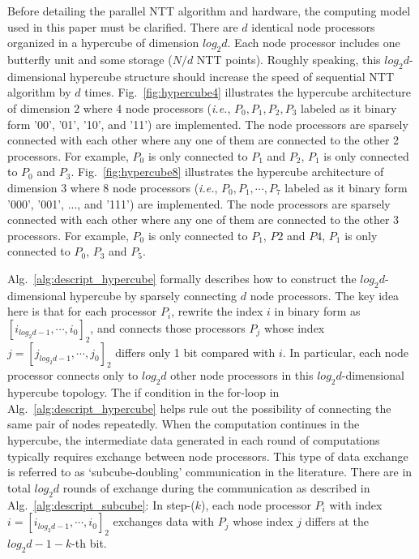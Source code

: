 \documentclass{iacrtrans}
\theoremstyle{plain}
\begin{document}
Before detailing the parallel NTT algorithm and hardware, the computing model used in this paper must be clarified. There are $d$ identical node processors organized in a hypercube of dimension $log_2d$. Each node processor includes one butterfly unit and some storage ($N/d$ NTT points). Roughly speaking, this $log_2d$-dimensional hypercube structure should increase the speed of sequential NTT algorithm by $d$ times. Fig.~\ref{fig:hypercube4} illustrates the hypercube architecture of dimension $2$ where $4$ node processors (\textit{i.e.}, $P_0,P_1,P_2,P_3$ labeled as it binary form '00', '01', '10', and '11') are implemented. The node processors are sparsely connected with each other where any one of them are connected to the other 2 processors. For example, $P_0$ is only connected to $P_1$ and $P_2$,  $P_1$ is only connected to $P_0$ and $P_3$.
Fig.~\ref{fig:hypercube8} illustrates the hypercube architecture of dimension $3$ where $8$ node processors (\textit{i.e.}, $P_0,P_1,\cdots,P_7$ labeled as it binary form '000', '001', ..., and '111') are implemented. The node processors are sparsely connected with each other where any one of them are connected to the other 3 processors. For example, $P_0$ is only connected to $P_1$, $P2$ and $P4$,  $P_1$ is only connected to $P_0$, $P_3$ and $P_5$.


Alg.~\ref{alg:descript_hypercube} formally describes how to construct the $log_2d$-dimensional hypercube by sparsely connecting $d$ node processors. The key idea here is that for each processor $P_i$, rewrite the index $i$ in binary form as $[i_{log_2d-1},\cdots,i_0]_2$, and connects those processors $P_j$ whose index $j=[j_{log_2d-1},\cdots,j_0]_2$ differs only 1 bit compared with $i$. In particular, each node processor connects only to $log_2d$ other node processors in this $log_2d$-dimensional hypercube topology. The if condition in the for-loop in Alg.~\ref{alg:descript_hypercube} helps rule out the possibility of connecting the same pair of nodes repeatedly.
{}
When the computation continues in the hypercube, the intermediate data generated in each round of computations typically requires exchange between node processors. This type of data exchange is referred to as `subcube-doubling' communication in the literature. There are in total $log_2d$ rounds of exchange during the communication as described in Alg.~\ref{alg:descript_subcube}: In step-($k$), each node processor $P_i$ with index $i=[i_{log_2d-1},\cdots,i_{0}]_2$ exchanges data with $P_j$ whose index $j$ differs at the $log_2d-1-k$-th bit. 
\end{document}
